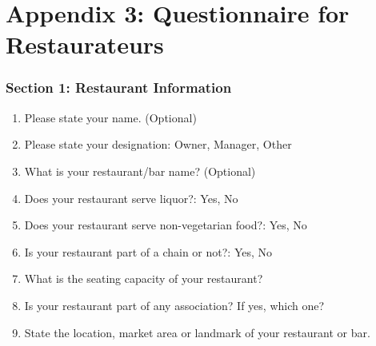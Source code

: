 \documentclass[a4paper, 12pt]{article}
\begin{document}
		\newpage
		\section*{Appendix 3: Questionnaire for Restaurateurs}
		   \label {Appendix 3}
	
	\subsubsection {Section 1: Restaurant Information}
		\begin {enumerate}
		\item Please state your name. (Optional)
		\item Please state your designation: Owner, Manager, Other
		\item What is your restaurant/bar name? (Optional)
		\item Does your restaurant serve liquor?: Yes, No
		\item Does your restaurant serve non-vegetarian food?: Yes, No
		\item Is your restaurant part of a chain or not?:  Yes, No
		\item What is the seating capacity of your restaurant?
		\item Is your restaurant part of any association? If yes, which one?
		\item State the location, market area or landmark of your restaurant or bar.\\
		

\end{enumerate}
\end{document}
